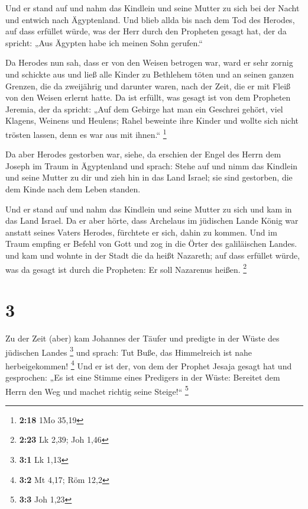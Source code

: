  Und er stand auf und nahm das Kindlein und seine Mutter zu
sich bei der Nacht und entwich nach Ägyptenland.  Und blieb
allda bis nach dem Tod des Herodes, auf dass erfüllet würde, was der
Herr durch den Propheten gesagt hat, der da spricht: „Aus Ägypten habe
ich meinen Sohn gerufen.``

 Da Herodes nun sah, dass er von den Weisen betrogen war,
ward er sehr zornig und schickte aus und ließ alle Kinder zu Bethlehem
töten und an seinen ganzen Grenzen, die da zweijährig und darunter
waren, nach der Zeit, die er mit Fleiß von den Weisen erlernt hatte.
 Da ist erfüllt, was gesagt ist von dem Propheten Jeremia,
der da spricht:  „Auf dem Gebirge hat man ein Geschrei
gehört, viel Klagens, Weinens und Heulens; Rahel beweinte ihre Kinder
und wollte sich nicht trösten lassen, denn es war aus mit ihnen.``
\footnote{\textbf{2:18} 1Mo 35,19}

 Da aber Herodes gestorben war, siehe, da erschien der
Engel des Herrn dem Joseph im Traum in Ägyptenland  und
sprach: Stehe auf und nimm das Kindlein und seine Mutter zu dir und zieh
hin in das Land Israel; sie sind gestorben, die dem Kinde nach dem Leben
standen.

 Und er stand auf und nahm das Kindlein und seine Mutter zu
sich und kam in das Land Israel.  Da er aber hörte, dass
Archelaus im jüdischen Lande König war anstatt seines Vaters Herodes,
fürchtete er sich, dahin zu kommen. Und im Traum empfing er Befehl von
Gott und zog in die Örter des galiläischen Landes.  und kam
und wohnte in der Stadt die da heißt Nazareth; auf dass erfüllet würde,
was da gesagt ist durch die Propheten: Er soll Nazarenus heißen.
\footnote{\textbf{2:23} Lk 2,39; Joh 1,46}

\hypertarget{section-1}{%
\section{3}\label{section-1}}

 Zu der Zeit (aber) kam Johannes der Täufer und predigte in
der Wüste des jüdischen Landes \footnote{\textbf{3:1} Lk 1,13}
 und sprach: Tut Buße, das Himmelreich ist nahe
herbeigekommen! \footnote{\textbf{3:2} Mt 4,17; Röm 12,2} 
Und er ist der, von dem der Prophet Jesaja gesagt hat und gesprochen:
„Es ist eine Stimme eines Predigers in der Wüste: Bereitet dem Herrn den
Weg und machet richtig seine Steige!{}`` \footnote{\textbf{3:3} Joh 1,23}

